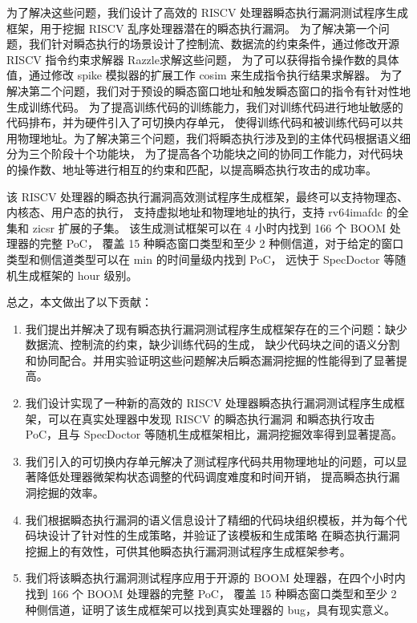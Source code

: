 为了解决这些问题，我们设计了高效的 RISCV 处理器瞬态执行漏洞测试程序生成框架，用于挖掘 RISCV 乱序处理器潜在的瞬态执行漏洞。
为了解决第一个问题，我们针对瞬态执行的场景设计了控制流、数据流的约束条件，通过修改开源 RISCV 指令约束求解器 Razzle\cite{razzle}求解这些问题，
为了可以获得指令操作数的具体值，通过修改 spike 模拟器\cite{riscv-isa-sim}的扩展工作 cosim \cite{riscv-isa-cosim}来生成指令执行结果求解器。
为了解决第二个问题，我们对于预设的瞬态窗口地址和触发瞬态窗口的指令有针对性地生成训练代码。
为了提高训练代码的训练能力，我们对训练代码进行地址敏感的代码排布，并为硬件引入了可切换内存单元，
使得训练代码和被训练代码可以共用物理地址。为了解决第三个问题，我们将瞬态执行涉及到的主体代码根据语义细分为三个阶段十个功能块，
为了提高各个功能块之间的协同工作能力，对代码块的操作数、地址等进行相互的约束和匹配，以提高瞬态执行攻击的成功率。\par

该 RISCV 处理器的瞬态执行漏洞高效测试程序生成框架，最终可以支持物理态、内核态、用户态的执行，
支持虚拟地址和物理地址的执行，支持 rv64imafdc 的全集和 zicsr 扩展的子集\cite{riscv-isa-manual-all}。
该生成测试框架可以在 4 小时内找到 166 个 BOOM 处理器的完整 PoC，
覆盖 15 种瞬态窗口类型和至少 2 种侧信道，对于给定的窗口类型和侧信道类型可以在 min 的时间量级内找到 PoC，
远快于 SpecDoctor\cite{hur2022specdoctor} 等随机生成框架的 hour 级别。\par

总之，本文做出了以下贡献：\par

\begin{enumerate}
    \item 我们提出并解决了现有瞬态执行漏洞测试程序生成框架存在的三个问题：缺少数据流、控制流的约束，缺少训练代码的生成，
缺少代码块之间的语义分割和协同配合。并用实验证明这些问题解决后瞬态漏洞挖掘的性能得到了显著提高。\par
    \item 我们设计实现了一种新的高效的 RISCV 处理器瞬态执行漏洞测试程序生成框架，可以在真实处理器中发现 RISCV 的瞬态执行漏洞
    和瞬态执行攻击 PoC，且与 SpecDoctor 等随机生成框架相比，漏洞挖掘效率得到显著提高。\par
    \item 我们引入的可切换内存单元解决了测试程序代码共用物理地址的问题，可以显著降低处理器微架构状态调整的代码调度难度和时间开销，
提高瞬态执行漏洞挖掘的效率。\par
    \item 我们根据瞬态执行漏洞的语义信息设计了精细的代码块组织模板，并为每个代码块设计了针对性的生成策略，并验证了该模板和生成策略
在瞬态执行漏洞挖掘上的有效性，可供其他瞬态执行漏洞测试程序生成框架参考。\par
    \item 我们将该瞬态执行漏洞测试程序应用于开源的 BOOM 处理器，在四个小时内找到 166 个 BOOM 处理器的完整 PoC，
覆盖 15 种瞬态窗口类型和至少 2 种侧信道，证明了该生成框架可以找到真实处理器的 bug，具有现实意义。\par
\end{enumerate}


